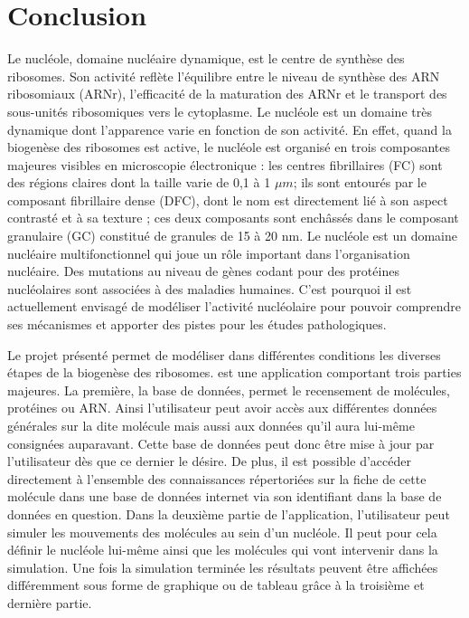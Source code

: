 \chapter*{Conclusion}

Le nucléole, domaine nucléaire dynamique, est le centre de synthèse
des ribosomes. Son activité reflète l'équilibre entre le niveau de
synthèse des ARN ribosomiaux (ARNr), l'efficacité de la maturation des
ARNr et le transport des sous-unités ribosomiques vers le
cytoplasme. Le nucléole est un domaine très dynamique dont l’apparence
varie en fonction de son activité. En effet, quand la biogenèse des
ribosomes est active, le nucléole est organisé en trois composantes
majeures visibles en microscopie électronique : les centres
fibrillaires (FC) sont des régions claires dont la taille varie de 0,1
à 1 $\mu m$; ils sont entourés par le composant fibrillaire dense
(DFC), dont le nom est directement lié à son aspect contrasté et à sa
texture ; ces deux composants sont enchâssés dans le composant
granulaire (GC) constitué de granules de 15 à 20 nm. Le nucléole est
un domaine nucléaire multifonctionnel qui joue un rôle important dans
l’organisation nucléaire. Des mutations au niveau de gènes codant pour
des protéines nucléolaires sont associées à des maladies
humaines. C'est pourquoi il est actuellement envisagé de modéliser
l'activité nucléolaire pour pouvoir comprendre ses mécanismes et
apporter des pistes pour les études pathologiques.

Le projet présenté permet de modéliser dans différentes conditions les
diverses étapes de la biogenèse des ribosomes. \NQ est une application
comportant trois parties majeures. La première, la base de données,
permet le recensement de molécules, protéines ou ARN. Ainsi
l'utilisateur peut avoir accès aux différentes données générales sur
la dite molécule mais aussi aux données qu'il aura lui-même consignées
auparavant. Cette base de données peut donc être mise à jour par
l'utilisateur dès que ce dernier le désire. De plus, il est possible
d'accéder directement à l'ensemble des connaissances répertoriées sur
la fiche de cette molécule dans une base de données internet via son
identifiant dans la base de données en question. Dans la deuxième
partie de l'application, l'utilisateur peut simuler les mouvements des
molécules au sein d'un nucléole. Il peut pour cela définir le nucléole
lui-même ainsi que les molécules qui vont intervenir dans la
simulation. Une fois la simulation terminée les résultats peuvent être
affichées différemment sous forme de graphique ou de tableau grâce à
la troisième et dernière partie.

